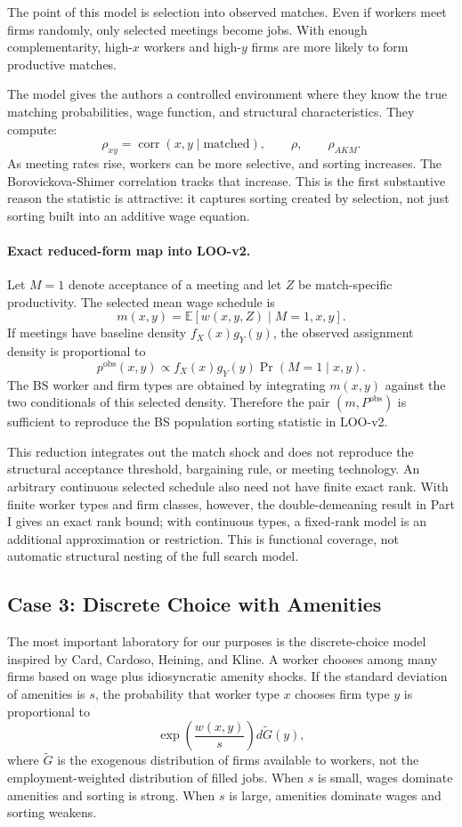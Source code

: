 \documentclass[11pt]{article}
\newcommand{\E}{\mathbb{E}}
\newcommand{\corr}{\operatorname{corr}}
\begin{document}
The point of this model is selection into observed matches. Even if workers meet firms randomly, only selected meetings become jobs. With enough complementarity, high-$x$ workers and high-$y$ firms are more likely to form productive matches.

The model gives the authors a controlled environment where they know the true matching probabilities, wage function, and structural characteristics. They compute:
\[
  \rho_{xy}=\corr(x,y\mid \text{matched}),
  \qquad
  \rho,
  \qquad
  \rho_{AKM}.
\]
As meeting rates rise, workers can be more selective, and sorting increases. The Borovickova-Shimer correlation tracks that increase. This is the first substantive reason the statistic is attractive: it captures sorting created by selection, not just sorting built into an additive wage equation.

\paragraph{Exact reduced-form map into LOO-v2.}
Let \(M=1\) denote acceptance of a meeting and let \(Z\) be match-specific
productivity.  The selected mean wage schedule is
\[
m(x,y)
=
\E[w(x,y,Z)\mid M=1,x,y].
\tag{selected-mean-schedule}
\]
If meetings have baseline density \(f_X(x)g_Y(y)\), the observed assignment
density is proportional to
\[
p^{\mathrm{obs}}(x,y)
\propto
f_X(x)g_Y(y)
\Pr(M=1\mid x,y).
\tag{selected-assignment}
\]
The BS worker and firm types are obtained by integrating
\(m(x,y)\) against the two conditionals of this selected density.  Therefore
the pair \((m,P^{\mathrm{obs}})\) is sufficient to reproduce the BS population
sorting statistic in LOO-v2.

This reduction integrates out the match shock and does not reproduce the
structural acceptance threshold, bargaining rule, or meeting technology.  An
arbitrary continuous selected schedule also need not have finite exact rank.
With finite worker types and firm classes, however, the double-demeaning result
in Part I gives an exact rank bound; with continuous types, a fixed-rank model
is an additional approximation or restriction.  This is functional coverage,
not automatic structural nesting of the full search model.

\subsection{Case 3: Discrete Choice with Amenities}

The most important laboratory for our purposes is the discrete-choice model inspired by Card, Cardoso, Heining, and Kline. A worker chooses among many firms based on wage plus idiosyncratic amenity shocks. If the standard deviation of amenities is $s$, the probability that worker type $x$ chooses firm type $y$ is proportional to
\[
  \exp\left(\frac{w(x,y)}{s}\right)d\widetilde G(y),
\]
where \(\widetilde G\) is the exogenous distribution of firms available to
workers, not the employment-weighted distribution of filled jobs.
When $s$ is small, wages dominate amenities and sorting is strong. When $s$ is large, amenities dominate wages and sorting weakens.
\end{document}

